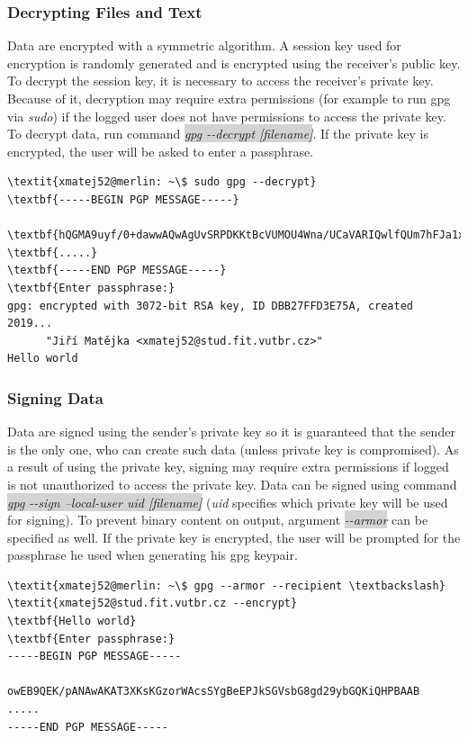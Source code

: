 \subsubsection*{Decrypting Files and Text}
Data are encrypted with a symmetric algorithm. A session key used for encryption is randomly generated and is encrypted using the receiver's public key. To decrypt the session key, it is necessary to access the receiver's private key. Because of it, decryption may require extra permissions (for example to run gpg via \textit{sudo}) if the logged user does not have permissions to access the private key. To decrypt data, run command \colorbox{lightgray}{\textit{gpg -{}-decrypt [filename]}}. If the private key is encrypted, the user will be asked to enter a passphrase.
\begin{Verbatim}[commandchars=\\\{\},codes={\catcode`$=3\catcode`_=8},samepage=true,frame=single]
\textit{xmatej52@merlin: ~\$ sudo gpg --decrypt}
\textbf{-----BEGIN PGP MESSAGE-----}

\textbf{hQGMA9uyf/0+dawwAQwAgUvSRPDKKtBcVUMOU4Wna/UCaVARIQwlfQUm7hFJa1xp}
\textbf{.....}
\textbf{-----END PGP MESSAGE-----}
\textbf{Enter passphrase:}
gpg: encrypted with 3072-bit RSA key, ID DBB27FFD3E75A, created 2019...
      "Jiří Matějka <xmatej52@stud.fit.vutbr.cz>"
Hello world
\end{Verbatim}

\subsubsection*{Signing Data}
Data are signed using the sender's private key so it is guaranteed that the sender is the only one, who can create such data (unless private key is compromised). As a result of using the private key, signing may require extra permissions if logged is not unauthorized to access the private key. Data can be signed using command \colorbox{lightgray}{\textit{gpg -{}-sign --local-user uid [filename]}} (\textit{uid} specifies which private key will be used for signing). To prevent binary content on output, argument \colorbox{lightgray}{\textit{-{}-armor}} can be specified as well. If the private key is encrypted, the user will be prompted for the passphrase he used when generating his gpg keypair.
\begin{Verbatim}[commandchars=\\\{\},codes={\catcode`$=3\catcode`_=8},samepage=true,frame=single]
\textit{xmatej52@merlin: ~\$ gpg --armor --recipient \textbackslash}
\textit{xmatej52@stud.fit.vutbr.cz --encrypt}
\textbf{Hello world}
\textbf{Enter passphrase:}
-----BEGIN PGP MESSAGE-----

owEB9QEK/pANAwAKAT3XKsKGzorWAcsSYgBeEPJkSGVsbG8gd29ybGQKiQHPBAAB
.....
-----END PGP MESSAGE-----
\end{Verbatim}

